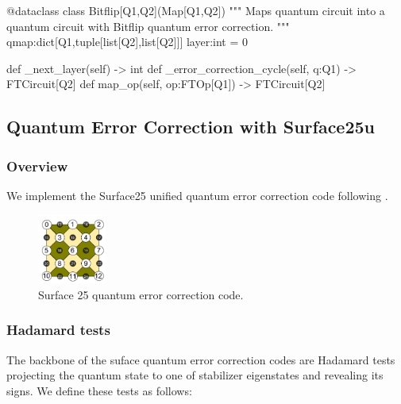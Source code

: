   \begin{python}
  @dataclass
  class Bitflip[Q1,Q2](Map[Q1,Q2])
    """ Maps quantum circuit into a quantum circuit with Bitflip quantum error correction. """
    qmap:dict[Q1,tuple[list[Q2],list[Q2]]]
    layer:int = 0

    def _next_layer(self) -> int
    def _error_correction_cycle(self, q:Q1) -> FTCircuit[Q2]
    def map_op(self, op:FTOp[Q1]) -> FTCircuit[Q2]
  \end{python}

\subsection{Quantum Error Correction with Surface25u}

\subsubsection{Overview}

We implement the Surface25 unified quantum error correction code following \cite{Tomita2014}.

\begin{figure}[h!]
  \centering
  \includegraphics[width=0.2\textwidth]{../img/surface25.png}
  \caption{Surface 25 quantum error correction code.}
  \label{fig:surface25}
\end{figure}


\subsubsection{Hadamard tests}

The backbone of the suface quantum error correction codes are Hadamard tests projecting the quantum
state to one of stabilizer eigenstates and revealing its signs. We define these tests as follows:


